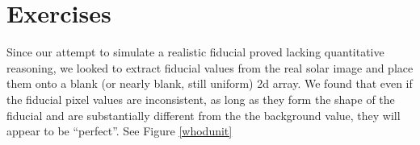 \documentclass[10pt]{article}
\begin{document}
\newpage

\section{Exercises}
    Since our attempt to simulate a realistic fiducial proved lacking quantitative reasoning, we looked to extract fiducial values from the real solar image and place them onto a blank (or nearly blank, still uniform) 2d array. We found that even if the fiducial pixel values are inconsistent, as long as they form the shape of the fiducial and are substantially different from the the background value, they will appear to be ``perfect''. See Figure \ref{whodunit}

\begin{figure}[!ht]
    \centering
\end{figure}
\end{document}
